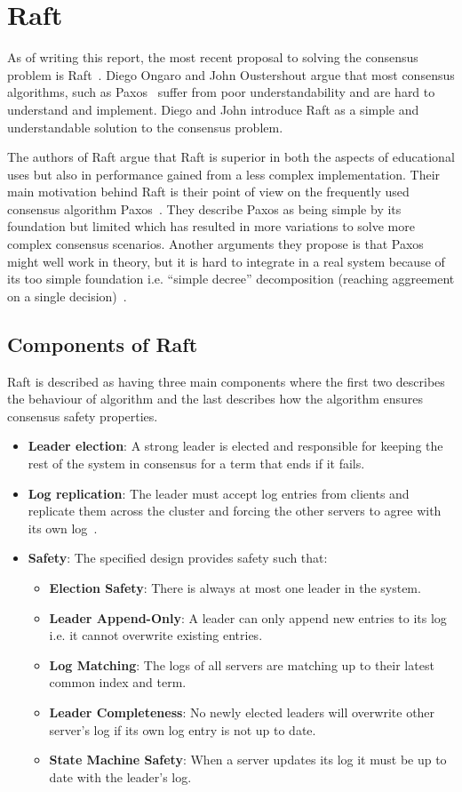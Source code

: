 \section{Raft}
\label{sec:raft}
As of writing this report, the most recent proposal to solving the consensus problem is Raft~\cite{Raft}. Diego Ongaro and John Oustershout argue that most consensus algorithms, such as Paxos~\cite{Paxos} suffer from poor understandability and are hard to understand and implement. Diego and John introduce Raft as a simple and understandable solution to the consensus problem.

The authors of Raft argue that Raft is superior in both the aspects of educational uses but also in performance gained from a less complex implementation. Their main motivation behind Raft is their point of view on the frequently used consensus algorithm Paxos~\cite{Paxos}. They describe Paxos as being simple by its foundation but limited which has resulted in more variations to solve more complex consensus scenarios. Another arguments they propose is that Paxos might well work in theory, but it is hard to integrate in a real system because of its too simple foundation i.e. ``simple decree'' decomposition (reaching aggreement on a single decision)~\cite{Raft}.

\subsection{Components of Raft}
Raft is described as having three main components where the first two describes the behaviour of algorithm and the last describes how the algorithm ensures consensus safety properties.

\begin{itemize}
  \item \textbf{Leader election}: A strong leader is elected and responsible for keeping the rest of the system in consensus for a term that ends if it fails.
  \item \textbf{Log replication}: The leader must accept log entries from clients and replicate them across the cluster and forcing the other servers to agree with its own log~\cite{Raft}.
  \item \textbf{Safety}: The specified design provides safety such that\cite{Raft}:
      \begin{itemize}
        \item \textbf{Election Safety}: There is always at most one leader in the system.
        \item \textbf{Leader Append-Only}: A leader can only append new entries to its log i.e. it cannot overwrite existing entries.
        \item \textbf{Log Matching}: The logs of all servers are matching up to their latest common index and term.
        \item \textbf{Leader Completeness}: No newly elected leaders will overwrite other server's log if its own log entry is not up to date.
        \item \textbf{State Machine Safety}: When a server updates its log it must be up to date with the leader's log.
      \end{itemize}
\end{itemize}

